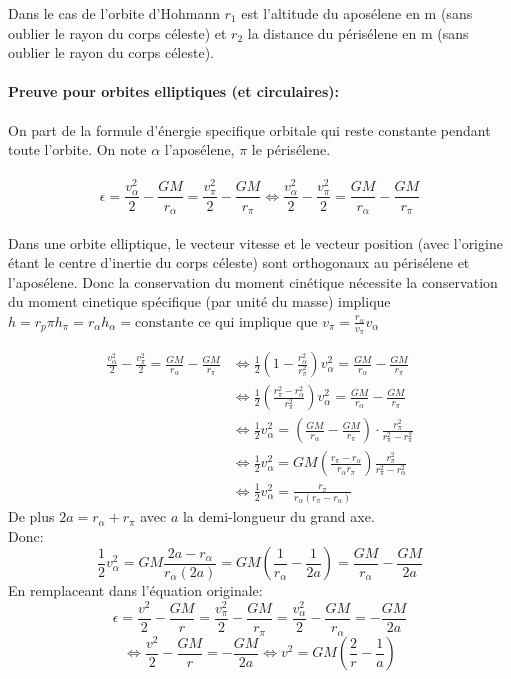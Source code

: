\documentclass[a4paper, 12pt]{scrartcl}
\begin{document}
Dans le cas de l'orbite d'Hohmann $r_1$ est l'altitude du aposélene en m (sans oublier le rayon du corps céleste) et $r_2$ la distance du périsélene en m (sans oublier le rayon du corps céleste).

\paragraph{Preuve pour orbites elliptiques (et circulaires): \\}
On part de la formule d'énergie specifique orbitale qui reste constante pendant toute l'orbite. On note $\alpha$ l'aposélene, $\pi$ le périsélene.
\\
\\
\[\epsilon = \frac{v_\alpha^2}{2} - \frac{GM}{r_\alpha} = \frac{v_\pi^2}{2} - \frac{GM}{r_\pi} \Leftrightarrow \frac{v_\alpha^2}{2}-\frac{v_\pi^2}{2} = \frac{GM}{r_\alpha} - \frac{GM}{r_\pi}\]
\\

Dans une orbite elliptique, le vecteur vitesse et le vecteur position (avec l'origine étant le centre d'inertie du corps céleste) sont orthogonaux au périsélene et l'aposélene.
Donc la conservation du moment cinétique nécessite la conservation du moment cinetique spécifique (par unité du masse) implique $h = r_p\pi h_\pi = r_\alpha h_\alpha = \text{constante}$
ce qui implique que $v_\pi = \frac{r_\alpha}{v_\pi}v_\alpha$

\[
\begin{aligned}
\frac{v_\alpha^2}{2}-\frac{v_\pi^2}{2} = \frac{GM}{r_\alpha} - \frac{GM}{r_\pi} &\Leftrightarrow \frac{1}{2}\left( 1-\frac{r_\alpha^2}{r_\pi^2} \right) v_\alpha^2 = \frac{GM}{r_\alpha}-\frac{GM}{r_\pi} \\
&\Leftrightarrow \frac{1}{2} \left( \frac{r_\pi^2-r_\alpha^2}{r_\pi^2} \right) v_\alpha^2 = \frac{GM}{r_\alpha} - \frac{GM}{r_\pi} \\
&\Leftrightarrow \frac{1}{2} v_\alpha^2 = \left( \frac{GM}{r_\alpha} - \frac{GM}{r_\pi} \right) \cdot \frac{r_\pi^2}{r_\pi^2-r_\pi^2} \\
&\Leftrightarrow \frac{1}{2} v_\alpha^2 = GM \left( \frac{r_\pi-r_\alpha}{r_\alpha r_\pi} \right) \frac{r_\pi^2}{r_\pi^2 - r_\alpha^2} \\
&\Leftrightarrow \frac{1}{2} v_\alpha^2 = \frac{r_\pi}{r_\alpha(r_\pi - r_\alpha)}
\end{aligned}
\]
De plus $2a = r_\alpha + r_\pi$ avec $a$ la demi-longueur du grand axe. 
\\
Donc:
\[ \frac{1}{2}v_\alpha^2 = GM\frac{2a - r_\alpha}{r_\alpha(2a)} = GM \left(\frac{1}{r_\alpha} - \frac{1}{2a}\right) = \frac{GM}{r_\alpha} - \frac{GM}{2a} \]
En remplaceant dans l'équation originale:
\[ \epsilon  = \frac{v^2}{2} - \frac{GM}{r} = \frac{v_\pi^2}{2} - \frac{GM}{r_\pi} = \frac{v_\alpha^2}{2} - \frac{GM}{r_\alpha} = -\frac{GM}{2a} \]
\[\Leftrightarrow  \frac{v^2}{2} -\frac{GM}{r} = - \frac{GM}{2a} \Leftrightarrow v^2 = GM \left( \frac{2}{r} - \frac{1}{a} \right) \]
\end{document}
